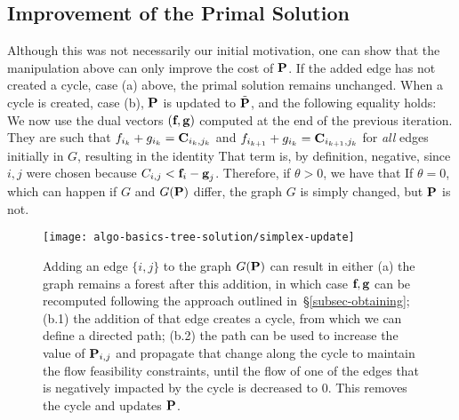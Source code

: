 \subsection{Improvement of the Primal Solution} Although this was not necessarily our initial motivation, one can show that the manipulation above can only improve the cost of $\P$. If the added edge has not created a cycle, case {(a)} above, the primal solution remains unchanged. When a cycle is created, case {(b)}, $\P$ is updated to $\tilde{\P}$, and the following equality holds:
We now use the dual vectors $(\fD,\gD)$ computed at the end of the previous iteration. They are such that $\f_{i_k}+\g_{i_k}=\C_{i_k,j_k}$ and $\f_{i_{k+1}}+\g_{i_k}=\C_{i_{k+1},j_k}$ for \emph{all} edges initially in $G$, resulting in the identity
That term is, by definition, negative, since $i,j$ were chosen because $C_{i,j} < \fD_{i} -\gD_{j}$. Therefore, if $\theta>0$, we have that  
If $\theta=0$, which can happen if $G$ and $G(\P)$ differ, the graph $G$ is simply changed, but $\P$ is not.


\begin{figure}[h!]
	\centering
	\texttt{[image: algo-basics-tree-solution/simplex-update]}
	\caption{\label{fig-simplex-update}
Adding an edge $\{i,j\}$ to the graph $G(\P)$ can result in either (a) the graph remains a forest after this addition, in which case $\fD,\gD$ can be recomputed following the approach outlined in~\S\ref{subsec-obtaining}; (b.1) the addition of that edge creates a cycle, from which we can define a directed path; (b.2) the path can be used to increase the value of $\P_{i,j}$ and propagate that change along the cycle to maintain the flow feasibility constraints, until the flow of one of the edges that is negatively impacted by the cycle is decreased to $0$. This removes the cycle and updates $\P$.}
\end{figure}

